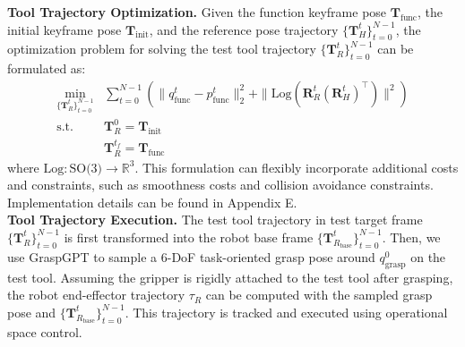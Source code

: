 \noindent \textbf{Tool Trajectory Optimization.} Given the function keyframe pose $\mathbf{T}_{\text{func}}$, the initial keyframe pose $\mathbf{T}_{\text{init}}$, and the reference pose trajectory $\{\mathbf{T}_H^t\}_{t=0}^{N-1}$, the optimization problem for solving the test tool trajectory $\{\mathbf{T}_R^t\}_{t=0}^{N-1}$ can be formulated as:
\begin{align*}
\min_{\{\mathbf{T}_R^t \}_{t=0}^{N-1}} & \sum_{t=0}^{N-1} \left(
\| q_{\text{func}}^t - p_{\text{func}}^t \|_2^2  + \| \text{Log}(\mathbf{R}_R^t (\mathbf{R}_H^t)^\top)\|^2 \right) \\
\text{s.t.}  \quad & \mathbf{T}_R^0  = \mathbf{T}_{\text{init}} \\
 \quad & \mathbf{T}_R^{t_f}  = \mathbf{T}_{\text{func}}
\end{align*}
where $\text{Log}:\text{SO(3)} \rightarrow \mathbb{R}^3$\cite{sola2018micro}. This formulation can flexibly incorporate additional costs and constraints, such as smoothness costs and collision avoidance constraints. Implementation details can be found in Appendix E. \\


\noindent \textbf{Tool Trajectory Execution.} 
The test tool trajectory in test target frame $\{\mathbf{T}_R^t\}_{t=0}^{N-1}$ is first transformed into the robot base frame $\{\mathbf{T}_{R_\text{base}}^t\}_{t=0}^{N-1}$. Then, we use GraspGPT \cite{tang2023graspgpt} to sample a 6-DoF task-oriented grasp pose around $q_{\text{grasp}}^0$ on the test tool. Assuming the gripper is rigidly attached to the test tool after grasping, the robot end-effector trajectory $\tau_R$ can be computed with the sampled grasp pose and $\{ \mathbf{T}_{R_\text{base}}^t\}_{t=0}^{N-1}$.
This trajectory is tracked and executed using operational space control.




































